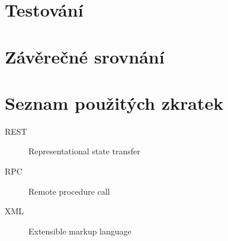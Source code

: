 \documentclass[thesis=M,czech]{FITthesis}[2019/12/23]
\begin{document}
\chapter{Testování}

\chapter{Závěrečné srovnání}

\begin{conclusion}
\end{conclusion}




\appendix

\chapter{Seznam použitých zkratek}
\begin{description}
	\item[REST] Representational state transfer
	\item[RPC] Remote procedure call
	\item[XML] Extensible markup language
\end{description}
\end{document}
